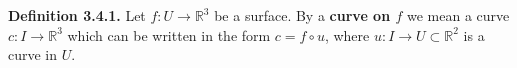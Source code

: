 \textbf{Definition 3.4.1.} Let $f: U \to \mathbb{R}^3$ be a surface. By a \textbf{curve on $f$} we mean a curve $c: I \to \mathbb{R}^3$ which can be written in the form $c = f \circ u$, where $u: I \to U \subset \mathbb{R}^2$ is a curve in $U$.
